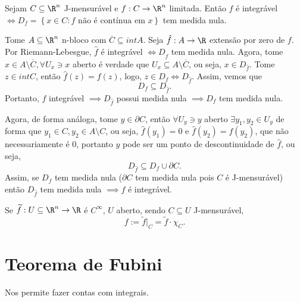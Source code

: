 \begin{prop}
    Sejam $C\subseteq \R^{n}$ J-mensurável e $f:C\to \R^{n}$ limitada. Então $f$ é integrável $\iff D_f = \left\{ x \in C : f\text{ não é contínua em }x \right\} $ tem medida nula.
\end{prop}

\begin{demo}
    Tome $A\subseteq\R^{n}$ n-bloco com $\overline{C}\subseteq int A$. Seja $\hat{f}:A\to \R$ extensão por zero de $f$. Por Riemann-Lebesgue, $\hat{f}$ é integrável $\iff D_{\hat{f}}$ tem medida nula. Agora, tome $x\in A\setminus \overline{C}, \forall  U_x \ni x$ aberto é verdade que $U_x \subseteq A\setminus \overline{C}$, ou seja, $x\in D_{\hat{f}}$. Tome $z\in int C$, então $\hat{f}\left( z \right) = f\left( z \right) $, logo, $ z\in D_f \iff D_{\hat{f}}$. Assim, vemos que \[
    D_f \subseteq D_{\hat{f}}
    .\] Portanto, $f$ integrável $\implies D_{\hat{f}}$ possui medida nula $\implies D_f$ tem medida nula.

    Agora, de forma análoga, tome $ y\in \partial C$, então $\forall U_y \ni y$ aberto $\exists y_1,y_2 \in U_y$ de forma que $y_1\in C, y_2\in A\setminus C$, ou seja, $\hat{f}\left( y_1 \right) = 0$ e $\hat{f}\left( y_2 \right) = f\left( y_2 \right) $, que não necessariamente é 0, portanto $y$ pode ser um ponto de descontinuidade de $\hat{f}$, ou seja, \[
    D_{\hat{f}}\subseteq D_f \cup \partial C
.\] Assim, se $D_f$ tem medida nula ($\partial C$ tem medida nula pois $C$ é J-mensurável) então $D_{\hat{f}}$ tem medida nula $\implies f$ é integrável.
\end{demo}

\begin{remark}
    Se $\widetilde{f}:U\subseteq\R^{n} \to \R$ é $C^{\infty}$, $U$ aberto, sendo $C\subseteq U $ J-mensurável,  \[
    f := \widetilde{f}|_C  = \widetilde{f} \cdot \chi_C
    .\] 
\end{remark}

\section*{Teorema de Fubini}

Nos permite fazer contas com integrais.

